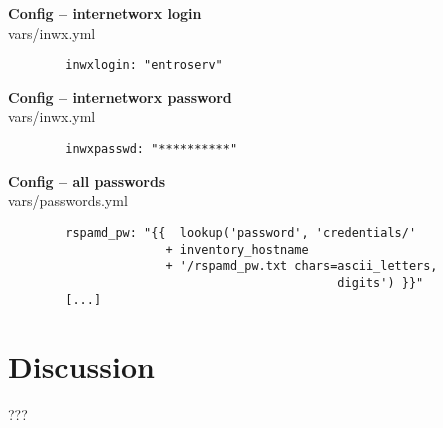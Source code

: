 \documentclass{beamer}
\begin{document}
\begin{frame}[fragile]{\insertsection}{\insertsubsection}
	\vspace{-0.5cm}
	\textbf{Config -- internetworx login}\\
	vars/inwx.yml
	\begin{verbatim}
		inwxlogin: "entroserv"
	\end{verbatim}
	
	\textbf{Config -- internetworx password}\\
	vars/inwx.yml
	\begin{verbatim}
		inwxpasswd: "**********"
	\end{verbatim}
\end{frame}	

\begin{frame}[fragile]{\insertsection}{\insertsubsection}
	\vspace{-0.5cm}
	
	\textbf{Config -- all passwords}\\
	vars/passwords.yml
	\begin{verbatim}
		rspamd_pw: "{{  lookup('password', 'credentials/'
		              + inventory_hostname
		              + '/rspamd_pw.txt chars=ascii_letters,
		                                      digits') }}"
		[...]
	\end{verbatim}
\end{frame}	

\section{Discussion}
\begin{frame}[fragile]{\insertsection}{\insertsubsection} %
  \Huge{???}	
\end{frame}	
\end{document}
